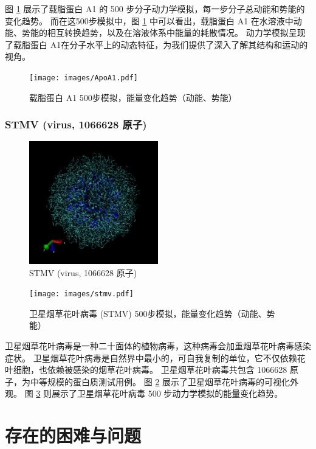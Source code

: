 图 \ref{fig:apoa1-plot} 展示了载脂蛋白 A1 的 500 步分子动力学模拟，每一步分子总动能和势能的变化趋势。
而在这500步模拟中，图 \ref{fig:apoa1-plot} 中可以看出，载脂蛋白 A1 在水溶液中动能、势能的相互转换趋势，以及在溶液体系中能量的耗散情况。
动力学模拟呈现了载脂蛋白 A1在分子水平上的动态特征，为我们提供了深入了解其结构和运动的视角。

\begin{figure}[h]
    \centering
    \texttt{[image: images/ApoA1.pdf]}
    \caption{载脂蛋白 A1 500步模拟，能量变化趋势（动能、势能）}
    \label{fig:apoa1-plot}
\end{figure}


\subsubsection{STMV (virus, 1066628 原子)}

\begin{figure}[h]
    \centering
    \includegraphics[width=0.5\textwidth]{images/STMV.png}
    \caption{STMV (virus, 1066628 原子)}
    \label{fig:stmv}
\end{figure}

\begin{figure}[h]
    \centering
    \texttt{[image: images/stmv.pdf]}
    \caption{卫星烟草花叶病毒 (STMV) 500步模拟，能量变化趋势（动能、势能）}
    \label{fig:stmv-plot}
\end{figure}

卫星烟草花叶病毒是一种二十面体的植物病毒，这种病毒会加重烟草花叶病毒感染症状。
卫星烟草花叶病毒是自然界中最小的，可自我复制的单位，它不仅依赖花叶细胞，也依赖被感染的烟草花叶病毒。
卫星烟草花叶病毒共包含 1066628 原子，为中等规模的蛋白质测试用例。
图 \ref{fig:stmv} 展示了卫星烟草花叶病毒的可视化外观。
图 \ref{fig:stmv-plot} 则展示了卫星烟草花叶病毒 500 步动力学模拟的能量变化趋势。




\section{存在的困难与问题}



